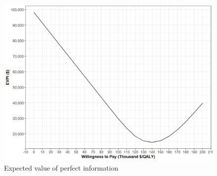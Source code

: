 \documentclass[]{book}
\begin{document}
\begin{figure}

{\centering \includegraphics[width=1\linewidth]{../figs/05c_evpi} 

}

\caption{Expected value of perfect information}\label{fig:05c-evpi}
\end{figure}


\end{document}

